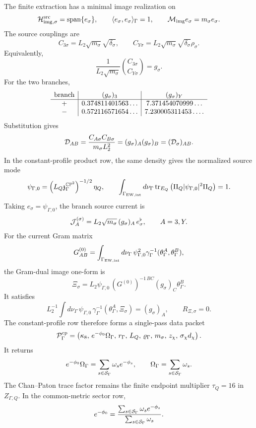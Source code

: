\documentclass[11pt]{article}
\theoremstyle{definition}
\theoremstyle{remark}
\newcommand{\CP}{\mathbb{CP}}
\begin{document}
The finite extraction has a minimal image realization on
\[
  {\cal H}_{{\rm img},\sigma}^{\rm src}
  =
  {\rm span}\{e_\sigma\},
  \qquad
  \langle e_\sigma,e_\sigma\rangle_\Gamma=1,
  \qquad
  {\cal M}_{\rm img}e_\sigma=m_\sigma e_\sigma .
\]
The source couplings are
\[
  C_{3\sigma}
  =
  L_2\sqrt{m_\sigma}\sqrt{\delta_\sigma},
  \qquad
  C_{Y\sigma}
  =
  L_2\sqrt{m_\sigma}\sqrt{\delta_\sigma}\rho_\sigma .
\]
Equivalently,
\[
  \frac{1}{L_2\sqrt{m_\sigma}}
  \binom{C_{3\sigma}}{C_{Y\sigma}}
  =
  g_\sigma .
\]
For the two branches,
\[
\begin{array}{c|c|c}
{\rm branch}&(g_\sigma)_3&(g_\sigma)_Y\\ \hline
+&0.374811401563\ldots&7.371454070999\ldots\\
-&0.572116571654\ldots&7.230005311453\ldots .
\end{array}
\]
Substitution gives
\[
  {\cal D}_{AB}
  =
  \frac{C_{A\sigma}C_{B\sigma}}{m_\sigma L_2^2}
  =
  (g_\sigma)_A(g_\sigma)_B
  =
  ({\cal D}_\sigma)_{AB}.
\]
In the constant-profile product row, the same density gives the normalized
source mode
\[
  \psi_{\Gamma,0}
  =
  \left(L_Q{\mathfrak z}_{\Gamma}^{\CP^2}\right)^{-1/2}\eta_Q,
  \qquad
  \int_{\Gamma_{\rm EW,int}}d\nu_\Gamma\,
  {\rm tr}_{E_Q}\left(\Pi_Q|\psi_{\Gamma,0}|^2\Pi_Q\right)=1 .
\]
Taking \(e_\sigma=\psi_{\Gamma,0}\), the branch source current is
\[
  {\cal J}_A^{(\sigma)}
  =
  L_2\sqrt{m_\sigma}\,(g_\sigma)_A\,e_\sigma^\flat,
  \qquad A=3,Y.
\]
For the current Gram matrix
\[
  G_{AB}^{(0)}
  =
  \int_{\Gamma_{\rm EW,int}}d\nu_\Gamma\,
  \psi_{\Gamma,0}^2
  \gamma_\Gamma^{-1}(\theta_\Gamma^A,\theta_\Gamma^B),
\]
the Gram-dual image one-form is
\[
  \Xi_\sigma
  =
  L_2\psi_{\Gamma,0}\,
  (G^{(0)})^{-1\,BC}(g_\sigma)_C\theta_\Gamma^B .
\]
It satisfies
\[
  L_2^{-1}
  \int d\nu_\Gamma\,\psi_{\Gamma,0}\,
  \gamma_\Gamma^{-1}(\theta_\Gamma^A,\Xi_\sigma)
  =
  (g_\sigma)_A,
  \qquad
  R_{\Xi,\sigma}=0 .
\]
The constant-profile row therefore forms a single-pass data packet
\[
  {\cal P}_{\Gamma}^{\rm cp}
  =
  \left(
  \kappa_8,\,
  e^{-\phi_0}\Omega_\Gamma,\,
  r_\Gamma,\,
  L_Q,\,
  \varrho_\Gamma,\,
  m_\sigma,\,
  z_\chi,\,
  \sigma_\chi d_\chi
  \right).
\]
It returns
\[
  e^{-\phi_0}\Omega_\Gamma
  =
  \sum_{s\in{\cal S}_\Gamma}\omega_s e^{-\phi_s},
  \qquad
  \Omega_\Gamma
  =
  \sum_{s\in{\cal S}_\Gamma}\omega_s .
\]
The Chan--Paton trace factor remains the finite endpoint multiplier
\(\tau_Q=16\) in \(Z_{\Gamma,Q}\).  In the common-metric sector row,
\[
  e^{-\phi_0}
  =
  \frac{\sum_{s\in{\cal S}_\Gamma}\omega_s e^{-\phi_s}}
  {\sum_{s\in{\cal S}_\Gamma}\omega_s}.
\]
\end{document}
